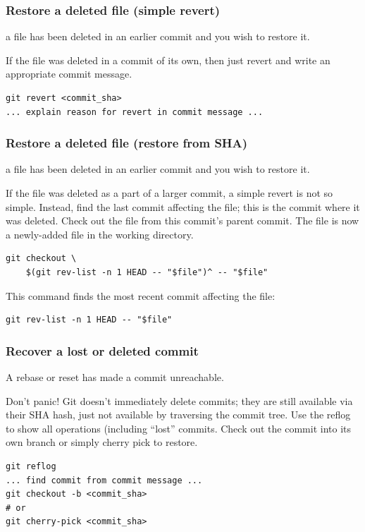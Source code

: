 \documentclass{git_course}
\begin{document}
\begin{frame}[fragile]
    \frametitle{Restore a deleted file (simple revert)}
     a file has been deleted in an earlier commit and you wish
    to restore it.

     If the file was deleted in a commit of its own, then
    just revert and write an appropriate commit message.
\begin{lstlisting}
git revert <commit_sha>
... explain reason for revert in commit message ...
\end{lstlisting}
\end{frame}

\begin{frame}[fragile]
    \frametitle{Restore a deleted file (restore from SHA)}
     a file has been deleted in an earlier commit and you wish
    to restore it.

     If the file was deleted as a part of a larger commit, a
    simple revert is not so simple.  Instead, find the last commit affecting
    the file; this is the commit where it was deleted.  Check out the file
    from this commit's parent commit.  The file is now a newly-added file in
    the working directory.
\begin{lstlisting}
git checkout \
    $(git rev-list -n 1 HEAD -- "$file")^ -- "$file"
\end{lstlisting}

This command finds the most recent commit affecting the file:
\begin{lstlisting}
git rev-list -n 1 HEAD -- "$file"
\end{lstlisting}

\end{frame}

\begin{frame}[fragile]
    \frametitle{Recover a lost or deleted commit}
     A rebase or reset has made a commit unreachable.

     Don't panic! Git doesn't immediately delete commits;
    they are still available via their SHA hash, just not available by
    traversing the commit tree.  Use the reflog to show all operations
    (including ``lost'' commits.  Check out the commit into its own branch
    or simply cherry pick to restore.
\begin{lstlisting}
git reflog
... find commit from commit message ...
git checkout -b <commit_sha>
# or
git cherry-pick <commit_sha>
\end{lstlisting}

\end{frame}
\end{document}

